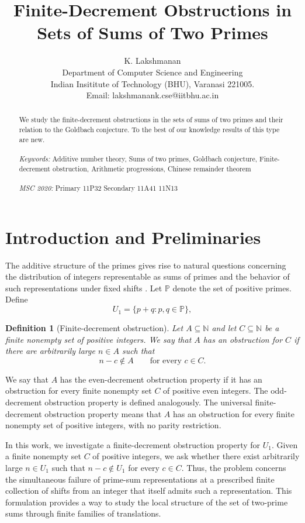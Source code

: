 \documentclass[11pt]{article}
\title{Finite-Decrement Obstructions in Sets of Sums of Two Primes}
\author{K. Lakshmanan \\ Department of Computer Science and Engineering \\ Indian Insititute of Technology (BHU), Varanasi 221005.\\ Email: lakshmanank.cse@iitbhu.ac.in}
\date{}
\newtheorem{definition}{Definition}
\newcommand{\N}{\mathbb{N}}
\newcommand{\Primes}{\mathbb{P}}
\begin{document}
	\maketitle
	
	\begin{abstract}
		We study the finite-decrement obstructions in the sets of sums of two primes and their relation to the Goldbach conjecture. To the best of our knowledge results of this type are new. \\
		\\
		\textit{Keywords:} Additive number theory, Sums of two primes, Goldbach conjecture, Finite-decrement obstruction, Arithmetic progressions, Chinese remainder theorem \\
		\\
		\textit{MSC 2020: } Primary 11P32 Secondary 11A41 11N13
	\end{abstract}
	
	\section{Introduction and Preliminaries}
	
	
	The additive structure of the primes gives rise to natural questions concerning the distribution of integers representable as sums of primes and the behavior of such representations under fixed shifts \cite{Nathanson1996}. Let $\Primes$ denote the set of positive primes. Define
	\[
	U_1=\{p+q:p,q\in\Primes\},
	\]
	
	\begin{definition}[Finite-decrement obstruction]
		Let $A\subseteq\N$ and let
		$C\subseteq\N$ be a finite nonempty set of positive integers.
		We say that $A$ has an obstruction for $C$ if there are
		arbitrarily large $n\in A$ such that
		\[
		n-c\notin A
		\qquad\text{for every }c\in C.
		\]
	\end{definition}
	
	We say that $A$ has the even-decrement obstruction property
	if it has an obstruction for every finite nonempty set
	$C$ of positive even integers. The odd-decrement obstruction
	property is defined analogously. The universal finite-decrement obstruction property means
	that
	$A$ has an obstruction for every finite nonempty set of
	positive integers, with no parity restriction.
	
	In this work, we investigate a finite-decrement obstruction property for \(U_1\). Given a finite nonempty set \(C\) of positive integers, we ask whether there exist arbitrarily large \(n\in U_1\) such that \(n-c\notin U_1\) for every \(c\in C\). Thus, the problem concerns the simultaneous failure of prime-sum representations at a prescribed finite collection of shifts from an integer that itself admits such a representation. This formulation provides a way to study the local structure of the set of two-prime sums through finite families of translations.
	
\end{document}
